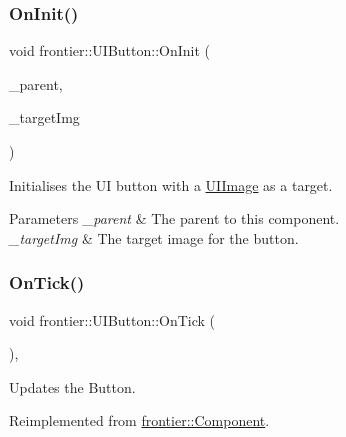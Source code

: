\subsubsection{\texorpdfstring{On\+Init()}{OnInit()}\hspace{0.1cm}{\footnotesize\ttfamily [2/2]}}
{\footnotesize\ttfamily void frontier\+::\+U\+I\+Button\+::\+On\+Init (\begin{DoxyParamCaption}\item[{std\+::weak\+\_\+ptr$<$ \hyperlink{classfrontier_1_1_entity}{Entity} $>$}]{\+\_\+parent,  }\item[{std\+::weak\+\_\+ptr$<$ \hyperlink{classfrontier_1_1_u_i_image}{U\+I\+Image} $>$}]{\+\_\+target\+Img }\end{DoxyParamCaption})}



Initialises the UI button with a \hyperlink{classfrontier_1_1_u_i_image}{U\+I\+Image} as a target. 


\begin{DoxyParams}{Parameters}
{\em \+\_\+parent} & The parent to this component. \\
\hline
{\em \+\_\+target\+Img} & The target image for the button. \\
\hline
\end{DoxyParams}
\mbox{\label{classfrontier_1_1_u_i_button_a8eda4323e4d0c2cd2c6a4639f39a1a09}} 
\subsubsection{\texorpdfstring{On\+Tick()}{OnTick()}}
{\footnotesize\ttfamily void frontier\+::\+U\+I\+Button\+::\+On\+Tick (\begin{DoxyParamCaption}{ }\end{DoxyParamCaption})\hspace{0.3cm}{\ttfamily [override]}, {\ttfamily [virtual]}}



Updates the Button. 



Reimplemented from \hyperlink{classfrontier_1_1_component_ab920f9bc07ce051ebb5559c5a66508d1}{frontier\+::\+Component}.

\mbox{\label{classfrontier_1_1_u_i_button_a0eade093232bc80046e2d9df0157e353}} 
